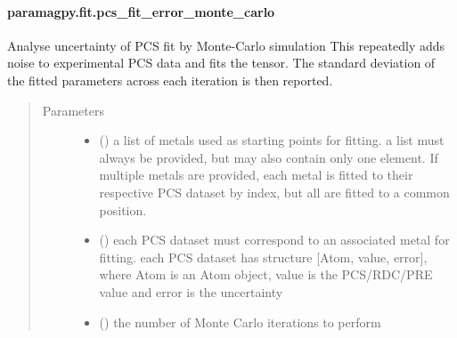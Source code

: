 \documentclass[a4paper,10pt,english,openany,oneside]{sphinxmanual}
\begin{document}
\paragraph{paramagpy.fit.pcs\_fit\_error\_monte\_carlo}
\label{\detokenize{reference/generated/paramagpy.fit.pcs_fit_error_monte_carlo:paramagpy-fit-pcs-fit-error-monte-carlo}}\label{\detokenize{reference/generated/paramagpy.fit.pcs_fit_error_monte_carlo::doc}}

\begin{fulllineitems}
\label{\detokenize{reference/generated/paramagpy.fit.pcs_fit_error_monte_carlo:paramagpy.fit.pcs_fit_error_monte_carlo}}
Analyse uncertainty of PCS fit by Monte-Carlo simulation
This repeatedly adds noise to experimental PCS data and fits the tensor.
The standard deviation of the fitted parameters across each iteration
is then reported.
\begin{quote}\begin{description}
\item[{Parameters}] \leavevmode\begin{itemize}
\item {} 
 () \textendash{} a list of metals used as starting points for fitting.
a list must always be provided, but may also contain
only one element. If multiple metals are provided, each metal
is fitted to their respective PCS dataset by index, but all are
fitted to a common position.

\item {} 
 () \textendash{} each PCS dataset must correspond to an associated metal for fitting.
each PCS dataset has structure {[}Atom, value, error{]}, where Atom is
an Atom object, value is the PCS/RDC/PRE value
and error is the uncertainty

\item {} 
 () \textendash{} the number of Monte Carlo iterations to perform


\end{itemize}
\end{description}
\end{quote}
\end{fulllineitems}
\end{document}
